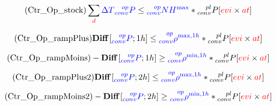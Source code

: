 \documentclass[a4paper,11pt]{article}
\begin{document}
\begin{equation} \tag{Ctr\_Op\_stock}
   \sum_{\textcolor{red}{d}} \textcolor{blue}{\Delta T} \textcolor{blue}{ \prescript{op}{conv}{P}}  \leq  \textcolor{blue}{\prescript{op}{conv}{NH^{\max}}} *  \prescript{pl}{conv}{P} \hfill [\textcolor{red}{evi}  \times \textcolor{red}{at}]
\label{eq:Ctr_Op_stock}
\end{equation}

\begin{equation} \tag{Ctr\_Op\_rampPlus}
   \textbf{Diff} \left [  \textcolor{blue}{ \prescript{op}{conv}{P}} ; 1h \right ] \leq  \textcolor{blue}{\prescript{op}{conv}{\rho^{\max,1h}}} *  \prescript{pl}{conv}{P} \hfill [\textcolor{red}{evi}  \times \textcolor{red}{at}]
\label{eq:Ctr_Op_rampPlus}
\end{equation}

\begin{equation} \tag{Ctr\_Op\_rampMoins}
   -\textbf{Diff} \left [  \textcolor{blue}{ \prescript{op}{conv}{P}} ; 1h \right ]  \geq  \textcolor{blue}{\prescript{op}{conv}{\rho^{\min,1h}}} *  \prescript{pl}{conv}{P} \hfill [\textcolor{red}{evi}  \times \textcolor{red}{at}]
\label{eq:Ctr_Op_rampMoins}
\end{equation}

\begin{equation} \tag{Ctr\_Op\_rampPlus2}
   \textbf{Diff} \left [  \textcolor{blue}{ \prescript{op}{conv}{P}} ; 2h \right ] \leq  \textcolor{blue}{\prescript{op}{conv}{\rho^{\max,1h}}} *  \prescript{pl}{conv}{P} \hfill [\textcolor{red}{evi}  \times \textcolor{red}{at}]
\label{eq:Ctr_Op_rampPlus2}
\end{equation}

\begin{equation} \tag{Ctr\_Op\_rampMoins2}
   -\textbf{Diff} \left [  \textcolor{blue}{ \prescript{op}{conv}{P}} ; 2h \right ]  \geq  \textcolor{blue}{\prescript{op}{conv}{\rho^{\min,1h}}} *  \prescript{pl}{conv}{P} \hfill [\textcolor{red}{evi}  \times \textcolor{red}{at}]
\label{eq:Ctr_Op_rampMoins2}
\end{equation}



\newpage
\end{document}
